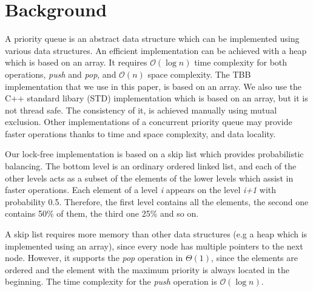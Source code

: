 \section{Background}\label{sec:background}

A priority queue is an abstract data structure which can be implemented using various data structures.
An efficient implementation can be achieved with a heap which is based on an array.
It requires $\mathcal{O}(\log{}n)$ time complexity for both operations, \textit{push} and \textit{pop}, and $\mathcal{O}(n)$ space complexity.
The TBB implementation that we use in this paper, is based on an array.
We also use the C++ standard libary (STD) implementation which is based on an array, but it is not thread safe.
The consistency of it, is achieved manually using mutual exclusion.
Other implementations of a concurrent priority queue may provide faster operations thanks to time and space complexity, and data locality.

Our lock-free implementation is based on a skip list \cite{Pugh:1990:SLP:78973.78977}  which provides probabilistic balancing.
The bottom level is an ordinary ordered linked list, and each of the other levels acts as a subset of the elements of the lower levels which assist in faster operations.
Each element of a level \textit{i} appears on the level \textit{i+1} with probability 0.5.
Therefore, the first level contains all the elements, the second one contains 50\% of them, the third one 25\% and so on.

A skip list requires more memory than other data structures (e.g a heap which is implemented using an array), since every node has multiple pointers to the next node.
However, it supports the \textit{pop} operation in $\Theta(1)$, since the elements are ordered and the element with the maximum priority is always located in the beginning.
The time complexity for the \textit{push} operation is $\mathcal{O}(\log{}n)$.
